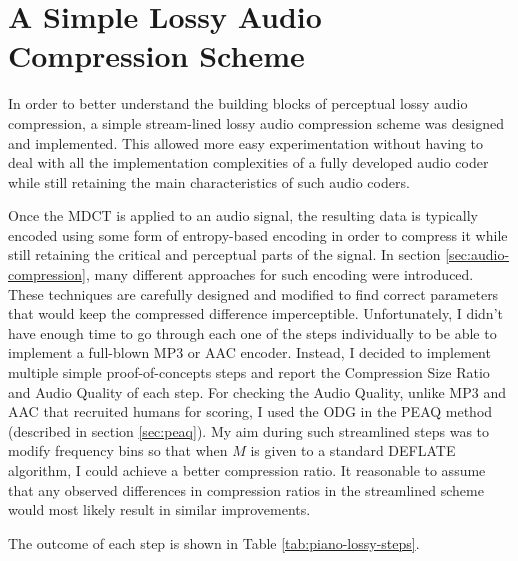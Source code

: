 \section{A Simple Lossy Audio Compression Scheme}
\label{sec:simple}

In order to better understand the building blocks of perceptual lossy audio compression, a simple stream-lined lossy audio compression scheme 
was designed and implemented. This allowed more easy experimentation without having to deal with all the implementation complexities of a fully developed audio coder while still retaining the main characteristics of such audio coders. 

Once the MDCT is applied to an audio signal, the resulting data is typically encoded using some form of entropy-based encoding in order to compress it while still retaining the critical and perceptual parts of the signal. In section \ref{sec:audio-compression}, many different approaches for such encoding were introduced. These techniques are carefully designed and modified to find correct parameters that would keep the compressed difference imperceptible. Unfortunately, I didn't have enough time to go through each one of the steps individually to be able to implement a full-blown MP3 or AAC encoder. Instead, I decided to implement  multiple simple proof-of-concepts steps and report the Compression Size Ratio and Audio Quality of each step. For checking the Audio Quality, unlike MP3 and AAC that recruited humans for scoring, I used the ODG in the PEAQ method (described in section \ref{sec:peaq}). My aim during such streamlined steps was to modify frequency bins so that when $M$ is given to a standard DEFLATE algorithm, I could achieve a better compression ratio. It reasonable to assume that any observed differences in compression ratios in the streamlined scheme would most likely result in similar improvements. 

The outcome of each step is shown in Table \ref{tab:piano-lossy-steps}.

